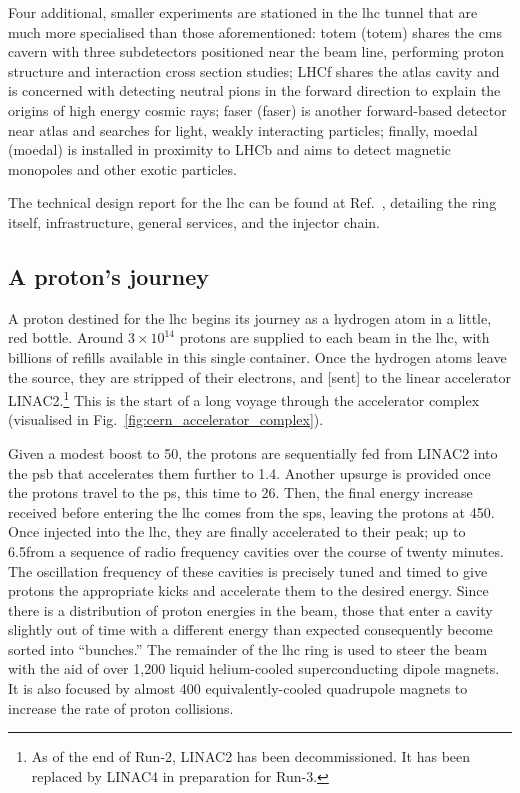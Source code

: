 Four additional, smaller experiments are stationed in the \acrshort{lhc} tunnel that are much more specialised than those aforementioned: \acrshort{totem} (\acrlong{totem}) shares the \acrshort{cms} cavern with three subdetectors positioned near the beam line, performing proton structure and interaction cross section studies; LHCf shares the \acrshort{atlas} cavity and is concerned with detecting neutral pions in the forward direction to explain the origins of high energy cosmic rays; \acrshort{faser} (\acrlong{faser}) is another forward-based detector near \acrshort{atlas} and searches for light, weakly interacting particles; finally, \acrshort{moedal} (\acrlong{moedal}) is installed in proximity to LHCb and aims to detect magnetic monopoles and other exotic particles.

The technical design report for the \acrshort{lhc} can be found at Ref.~, detailing the ring itself, infrastructure, general services, and the injector chain.




\subsection{A proton's journey}  %
\label{subsec:protons_journey}

A proton destined for the \acrshort{lhc} begins its journey as a hydrogen atom in a little, red bottle. Around $\text{3}\times\text{10}^{\text{14}}$ protons are supplied to each beam in the \acrshort{lhc}, with billions of refills available in this single container. Once the hydrogen atoms leave the source, they are stripped of their electrons, and [sent] to the linear accelerator LINAC2.\footnote{As of the end of Run-2, LINAC2 has been decommissioned. It has been replaced by LINAC4 in preparation for Run-3.} This is the start of a long voyage through the accelerator complex (visualised in Fig.~\ref{fig:cern_accelerator_complex}).

Given a modest boost to 50\MeV, the protons are sequentially fed from LINAC2 into the \acrfull{psb} that accelerates them further to 1.4\GeV. Another upsurge is provided once the protons travel to the \acrfull{ps}, this time to 26\GeV. Then, the final energy increase received before entering the \acrshort{lhc} comes from the \acrfull{sps}, leaving the protons at 450\GeV. Once injected into the \acrshort{lhc}, they are finally accelerated to their peak; up to 6.5\TeV from a sequence of radio frequency cavities over the course of twenty minutes. The oscillation frequency of these cavities is precisely tuned and timed to give protons the appropriate kicks and accelerate them to the desired energy. Since there is a distribution of proton energies in the beam, those that enter a cavity slightly out of time with a different energy than expected consequently become sorted into ``bunches.'' The remainder of the \acrshort{lhc} ring is used to steer the beam with the aid of over 1,200 liquid helium-cooled superconducting dipole magnets. It is also focused by almost 400 equivalently-cooled quadrupole magnets to increase the rate of proton collisions.

